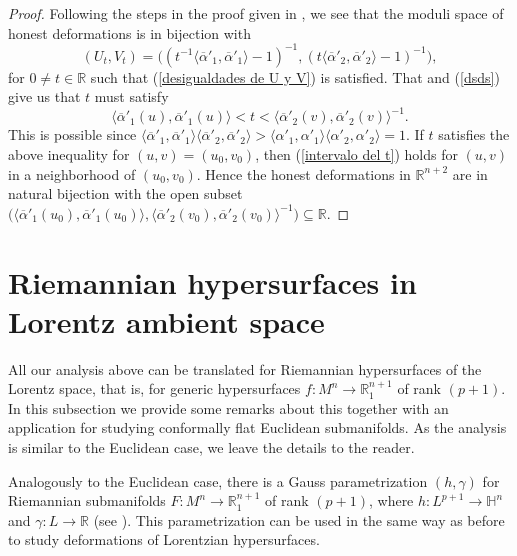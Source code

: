 \documentclass{article}
\theoremstyle{remark}
\begin{document}
\begin{proof}
    Following the steps in the proof given in \cite{FF}, we see that the moduli space of honest deformations is in bijection with 
    $$(U_t,V_t)=\big((t^{-1}\langle\overline{\alpha}'_1,\overline{\alpha}'_1\rangle-1)^{-1},(t\langle\overline{\alpha}'_2,\overline{\alpha}'_2\rangle-1)^{-1}\Big),$$
    for $0\neq t\in\mathbb{R}$ such that (\ref{desigualdades de U y V}) is satisfied. That and (\ref{dsds}) give us that $t$ must satisfy
    \begin{equation}\label{intervalo del t}
        \langle\overline{\alpha}'_1(u),\overline{\alpha}'_1(u)\rangle<t<\langle\overline{\alpha}'_2(v),\overline{\alpha}'_2(v)\rangle^{-1}.
    \end{equation}
    This is possible since $\langle\overline{\alpha}'_1,\overline{\alpha}'_1\rangle\langle\overline{\alpha}'_2,\overline{\alpha}'_2\rangle>\langle\alpha'_1,\alpha'_1\rangle\langle\alpha'_2,\alpha'_2\rangle=1$. If $t$ satisfies the above inequality for $(u,v)=(u_0,v_0)$, then (\ref{intervalo del t}) holds for $(u,v)$ in a neighborhood of $(u_0,v_0)$. Hence the honest deformations in $\mathbb{R}^{n+2}$ are in natural bijection with the open subset $\Big(\langle\overline{\alpha}'_1(u_0),\overline{\alpha}'_1(u_0)\rangle,\langle\overline{\alpha}'_2(v_0),\overline{\alpha}'_2(v_0)\rangle^{-1}\Big)\subseteq\mathbb{R}$.
\end{proof}

\section{Riemannian hypersurfaces in Lorentz ambient space}\label{Seccion lorentzianas}
All our analysis above can be translated for Riemannian hypersurfaces of the Lorentz space, that is, for generic hypersurfaces $f:M^n\rightarrow\mathbb{R}_1^{n+1}$ of rank $(p+1)$. In this subsection we provide some remarks about this together with an application for studying conformally flat Euclidean submanifolds. As the analysis is similar to the Euclidean case, we leave the details to the reader.

\text{ }

Analogously to the Euclidean case, there is a Gauss parametrization $(h,\gamma)$ for Riemannian submanifolds $F:M^n\rightarrow\mathbb{R}_1^{n+1}$ of rank $(p+1)$, where $h:L^{p+1}\rightarrow\mathbb{H}^n$ and $\gamma:L\rightarrow\mathbb{R}$ (see \cite{DG}). This parametrization can be used in the same way as before to study deformations of Lorentzian hypersurfaces.
\end{document}
